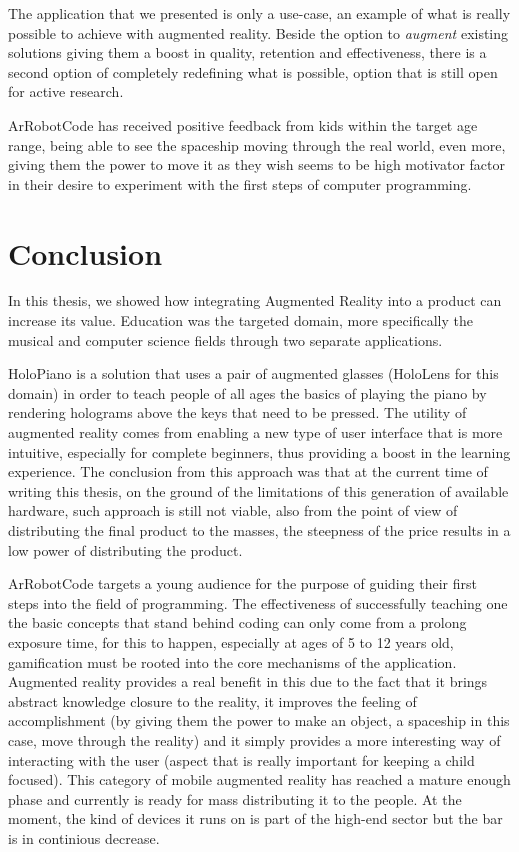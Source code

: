 \documentclass[12 pct]{report}
\begin{document}
The application that we presented is only a use-case, an example of what is really possible to achieve with augmented reality. Beside the option to \textit{augment} existing solutions giving them a boost in quality, retention and effectiveness, there is a second option of completely redefining what is possible, option that is still open for active research.

ArRobotCode has received positive feedback from kids within the target age range, being able to see the spaceship moving through the real world, even more, giving them the power to move it as they wish seems to be high motivator factor in their desire to experiment with the first steps of computer programming.


\chapter{Conclusion}
In this thesis, we showed how integrating Augmented Reality into a product can increase its value. Education was the targeted domain, more specifically the musical and computer science fields through two separate applications.

HoloPiano is a solution that uses a pair of augmented glasses (HoloLens for this domain) in order to teach people of all ages the basics of playing the piano by rendering holograms above the keys that need to be pressed. The utility of augmented reality comes from enabling a new type of user interface that is more intuitive, especially for complete beginners, thus providing a boost in the learning experience. The conclusion from this approach was that at the current time of writing this thesis, on the ground of the limitations of this generation of available hardware, such approach is still not viable, also from the point of view of distributing the final product to the masses, the steepness of the price results in a low power of distributing the product.

ArRobotCode targets a young audience for the purpose of guiding their first steps into the field of programming. The effectiveness of successfully teaching one the basic concepts that stand behind coding can only come from a prolong exposure time, for this to happen, especially at ages of 5 to 12 years old, gamification must be rooted into the core mechanisms of the application. Augmented reality provides a real benefit in this due to the fact that it brings abstract knowledge closure to the reality, it improves the feeling of accomplishment (by giving them the power to make an object, a spaceship in this case, move through the reality) and it simply provides a more interesting way of interacting with the user (aspect that is really important for keeping a child focused). This category of mobile augmented reality has reached a mature enough phase and currently is ready for mass distributing it to the people. At the moment, the kind of devices it runs on is part of the high-end sector but the bar is in continious decrease.
\end{document}

